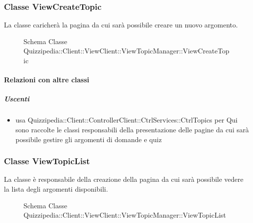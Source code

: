 \subsubsection{Classe ViewCreateTopic}
La classe caricherà la pagina da cui sarà possibile creare un nuovo argomento.
\begin{figure}[H]
\centering
\noindent{}
\caption[Schema Classe ViewCreateTopic]{Schema Classe Quizzipedia::Client::ViewClient::ViewTopicManager::ViewCreateTopic}
\end{figure}
\paragraph{Relazioni con altre classi}
\subparagraph{Uscenti}
\begin{itemize}
\item usa Quizzipedia::Client::ControllerClient::CtrlServices::CtrlTopics per Qui sono raccolte le classi responsabili della presentazione delle pagine da cui sarà possibile gestire gli argomenti di domande e quiz
\end{itemize}
\subsubsection{Classe ViewTopicList}
La classe è responsabile della creazione della pagina da cui sarà possibile vedere la lista degli argomenti disponibili.
\begin{figure}[H]
\centering
\noindent{}
\caption[Schema Classe ViewTopicList]{Schema Classe Quizzipedia::Client::ViewClient::ViewTopicManager::ViewTopicList}
\end{figure}
